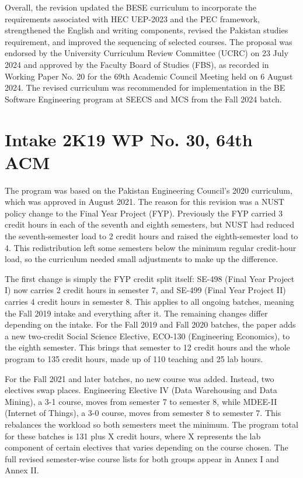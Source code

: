 Overall, the revision updated the BESE curriculum to incorporate the requirements associated with HEC UEP-2023 and the PEC framework, strengthened the English and writing components, revised the Pakistan studies requirement, and improved the sequencing of selected courses. The proposal was endorsed by the University Curriculum Review Committee (UCRC) on 23 July 2024 and approved by the Faculty Board of Studies (FBS), as recorded in Working Paper No. 20 for the 69th Academic Council Meeting held on 6 August 2024. The revised curriculum was recommended for implementation in the BE Software Engineering program at SEECS and MCS from the Fall 2024 batch.


\clearpage
{}
\section{Intake 2K19 WP No. 30, 64th ACM}
\label{app:criteria-3_intake-2K19-wp30}
 The program was based on the Pakistan Engineering Council’s 2020 curriculum, which was approved in August 2021. The reason for this revision was a NUST policy change to the Final Year Project (FYP). Previously the FYP carried 3 credit hours in each of the seventh and eighth semesters, but NUST had reduced the seventh-semester load to 2 credit hours and raised the eighth-semester load to 4. This redistribution left some semesters below the minimum regular credit-hour load, so the curriculum needed small adjustments to make up the difference.

The first change is simply the FYP credit split itself: SE-498 (Final Year Project I) now carries 2 credit hours in semester 7, and SE-499 (Final Year Project II) carries 4 credit hours in semester 8. This applies to all ongoing batches, meaning the Fall 2019 intake and everything after it. The remaining changes differ depending on the intake. For the Fall 2019 and Fall 2020 batches, the paper adds a new two-credit Social Science Elective, ECO-130 (Engineering Economics), to the eighth semester. This brings that semester to 12 credit hours and the whole program to 135 credit hours, made up of 110 teaching and 25 lab hours.

For the Fall 2021 and later batches, no new course was added. Instead, two electives swap places. Engineering Elective IV (Data Warehousing and Data Mining), a 3-1 course, moves from semester 7 to semester 8, while MDEE-II (Internet of Things), a 3-0 course, moves from semester 8 to semester 7. This rebalances the workload so both semesters meet the minimum. The program total for these batches is 131 plus X credit hours, where X represents the lab component of certain electives that varies depending on the course chosen. The full revised semester-wise course lists for both groups appear in Annex I and Annex II.

